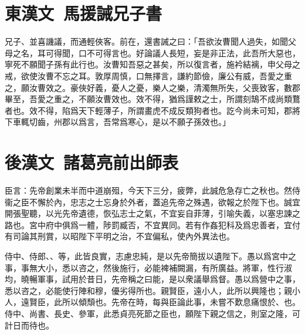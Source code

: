 \theendnotes

\section[馬援誡兄子嚴敦書\quad{\small 東漢文}]{{\normalsize 東漢文\ 馬援}\quad 誡兄子書}
兄子、並喜譏議，而通輕俠客。前在，還書誡之曰：「吾欲汝曹聞人過失，如聞父母之名，耳可得聞，口不可得言也。好論議人長短，妄是非正法，此吾所大惡也，寧死不願聞子孫有此行也。汝曹知吾惡之甚矣，所以復言者，施衿結褵，申父母之戒，欲使汝曹不忘之耳。敦厚周慎，口無擇言，謙約節儉，廉公有威，吾愛之重之，願汝曹效之。豪俠好義，憂人之憂，樂人之樂，清濁無所失，父喪致客，數郡畢至，吾愛之重之，不願汝曹效也。效不得，猶爲謹敕之士，所謂刻鵠不成尚類鶩者也。效不得，陷爲天下輕薄子，所謂畫虎不成反類狗者也。訖今尚未可知，郡將下車輒切齒，州郡以爲言，吾常爲寒心，是以不願子孫效也。」

\section[諸葛亮前出師表\quad{\small 後漢文}]{{\normalsize 後漢文\ 諸葛亮}\quad 前出師表}
臣言：先帝創業未半而中道崩殂，今天下三分，疲弊，此誠危急存亡之秋也。然侍衞之臣不懈於內，忠志之士忘身於外者，蓋追先帝之殊遇，欲報之於陛下也。誠宜開張聖聽，以光先帝遺德，恢弘志士之氣，不宜妄自菲薄，引喻失義，以塞忠諫之路也。宮中府中俱爲一體，陟罰臧否，不宜異同。若有作姦犯科及爲忠善者，宜付有司論其刑賞，以昭陛下平明之治，不宜偏私，使內外異法也。

侍中、侍郎、、等，此皆良實，志慮忠純，是以先帝簡拔以遺陛下。愚以爲宮中之事，事無大小，悉以咨之，然後施行，必能裨補闕漏，有所廣益。將軍，性行淑均，曉暢軍事，試用於昔日，先帝稱之曰能，是以衆議舉爲督。愚以爲營中之事，悉以咨之，必能使行陣和穆，優劣得所也。親賢臣，遠小人，此所以興隆也；親小人，遠賢臣，此所以傾頹也。先帝在時，每與臣論此事，未嘗不歎息痛恨於、也。侍中、尚書、長史、參軍，此悉貞亮死節之臣也，願陛下親之信之，則室之隆，可計日而待也。


